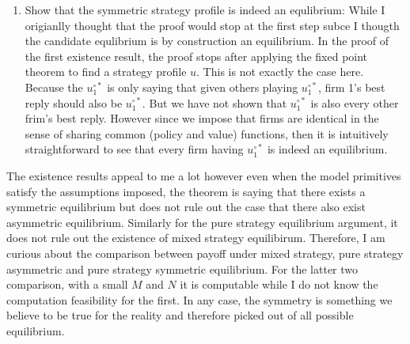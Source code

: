 \documentclass[12pt]{article}[margin=1in]
\begin{document}
\begin{enumerate}
\item Show that the symmetric strategy profile is indeed an equlibrium: While I origianlly thought that the proof would stop at the first step subce I thougth the candidate equlibrium is by construction an equilibrium. In the proof of the first existence result, the proof stops after applying the fixed point theorem to find a strategy profile $u$. This is not exactly the case here. Because the $u_1^{\circ *}$ is only saying that given others playing $u_1^{\circ *}$, firm 1's best reply should also be $u_1^{\circ *}$. But we have not shown that $u_1^{\circ *}$ is also every other frim's best reply. However since we impose that firms are identical in the sense of sharing common (policy and value) functions, then it is intuitively straightforward to see that every firm having $u_1^{\circ *}$ is indeed an equilibrium. 
     
\end{enumerate}

The existence results appeal to me a lot however even when the model primitives satisfy the assumptions imposed, the theorem is saying that there exists a symmetric equilibrium but does not rule out the case that there also exist asymmetric equilibrium. Similarly for the pure strategy equilibrium argument, it does not rule out the existence of mixed strategy equilibirum. Therefore, I am curious about the comparison between payoff under mixed strategy, pure strategy asymmetric and pure strategy symmetric equilibrium. For the latter two comparison, with a small $M$ and $N$ it is computable while I do not know the computation feasibility for the first. In any case, the symmetry is something we believe to be true for the reality and therefore picked out of all possible equilibrium.

\pagebreak \newpage 
\end{document}
